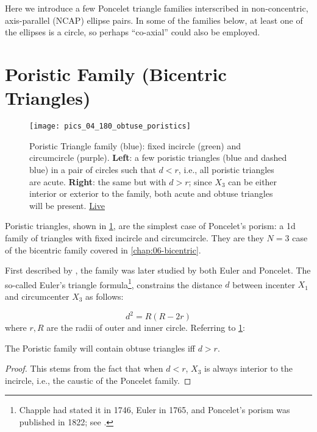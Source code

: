 Here we introduce a few Poncelet triangle families interscribed in non-concentric, axis-parallel (NCAP) ellipse pairs. In some of the families below, at least one of the ellipses is a circle, so perhaps ``co-axial'' could also be employed.

\section{Poristic Family (Bicentric Triangles)}
\label{sec:04-poristic}

\begin{figure}
    \centering
    \texttt{[image: pics\_04\_180\_obtuse\_poristics]}
    \caption{Poristic Triangle family (blue): fixed incircle (green) and circumcircle (purple). \textbf{Left}: a few poristic triangles (blue and dashed blue) in a pair of circles such that $d<r$, i.e.,  all poristic triangles are acute. \textbf{Right}: the same but with $d>r$; since $X_3$ can be either interior or exterior to the family, both acute and obtuse triangles will be present. \href{https://bit.ly/3bg19iD}{Live}}
    \label{fig:04-poristic obtuse}
\end{figure}

Poristic triangles, shown in \cref{fig:04-poristic obtuse}, are the simplest case of Poncelet's porism: a 1d family of triangles with fixed incircle and circumcircle. They are they $N=3$ case of the bicentric family covered in \cref{chap:06-bicentric}.

First described by \cite{chapple1746-poristics}, the family was later studied by both Euler and Poncelet. The so-called Euler's triangle formula\footnote{Chapple had stated it in 1746, Euler in 1765, and Poncelet's porism was published in 1822; see \cite{centina15}.}, constrains the distance $d$ between incenter $X_1$ and circumcenter $X_3$ as follows:

\begin{equation}
d^2=R(R-2 r)
\label{eq:04-euler-poristic}
\end{equation}
where $r,R$ are the radii of outer and inner circle. Referring to \cref{fig:04-poristic obtuse}:

\begin{proposition}
The Poristic family will contain obtuse triangles iff $d>r$.
\end{proposition}

\begin{proof}
This stems from the fact that when $d<r$, $X_3$ is always interior to the incircle, i.e., the caustic of the Poncelet family. 
\end{proof}

